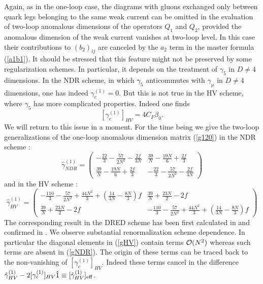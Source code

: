 \documentclass[12pt,rotate]{article}
\newcommand{\be}{\begin{equation}}
\newcommand{\ee}{\end{equation}}
\newcommand{\ord}{{\cal O}}
\begin{document}
\begin{itemize}
\begin{itemize}
\begin{itemize}
Again, as in the one-loop case, the diagrams with gluons exchanged only
between quark legs belonging to the same weak current can be omitted in
the evaluation of two-loop anomalous dimensions of the operators
$Q_1$ and $Q_2$, provided the anomalous dimension of the weak current
vanishes at two-loop level. In this case their contributions to
$(b_2)_{ij}$ are canceled by the $a_2$ term in the master formula
(\ref{a1b1}). It should be stressed that this
feature might not be preserved by some regularization schemes. In particular,
it depends on the treatment of $\gamma_5$ in $D\not=4$ dimensions.
In the NDR scheme, in which $\gamma_5$ anticommutes with $\gamma_\mu$ in
$D\not=4$ dimensions, one has indeed $\gamma^{(1)}_c=0$. But this is
not true in the HV scheme, where $\gamma_5$ has more complicated
properties. Indeed one finds \cite{WEISZ}
\be\label{anc}
[\gamma_c^{(1)}]_{HV}=4 C_F \beta_0.
\ee 
We will return to this issue in a moment. For the time being we 
give the two-loop generalizations of the one-loop anomalous
dimension matrix (\ref{g120}) in the NDR scheme \cite{WEISZ}:
\begin{equation}\label{gNDR} 
 \hat\gamma^{(1)}_{NDR}=
 \left(\begin{array}{cc}
 -\frac{22}{3}-\frac{57}{2 N^2}-\frac{2f}{3N} & 
  \frac{39}{N}-\frac{19N}{6}+\frac{2f}{3} \\
 \frac{39}{N}-\frac{19N}{6}+\frac{2f}{3} & 
 -\frac{22}{3}-\frac{57}{2 N^2}-\frac{2f}{3N}
    \end{array}\right)   
\end{equation}
and in the HV scheme \cite{WEISZ}:
\begin{equation}\label{gHV} 
 \hat\gamma^{(1)}_{HV}=
 \left(\begin{array}{cc}
 -\frac{110}{3}-\frac{57}{2 N^2}+\frac{44 N^2}{3}+
\left(\frac{14}{3N}-\frac{8N}{3}\right) f & 
  \frac{39}{N}+\frac{23N}{2}-2f \\
  \frac{39}{N}+\frac{23N}{2}-2f  & 
 -\frac{110}{3}-\frac{57}{2 N^2}+\frac{44 N^2}{3}+
\left(\frac{14}{3N}-\frac{8N}{3}\right) f
    \end{array}\right)   
\end{equation}
The corresponding result in the DRED scheme has been first
calculated in \cite{ACMP} and confirmed in \cite{WEISZ}.
We observe substantial renormalization scheme dependence. 
In particular the diagonal elements in (\ref{gHV}) contain
terms $\ord(N^2)$ whereas such terms are absent in (\ref{gNDR}).
The origin of these terms can be traced back to the non-vanishing
of $[\gamma_c^{(1)}]_{HV}$. Indeed these terms cancel in the
difference $\hat\gamma^{(1)}_{HV}-2 [\gamma_c^{(1)}]_{HV} \hat 1 
\equiv[\hat\gamma^{(1)}_{HV}]_{\rm eff}$.


\end{itemize}
\end{itemize}
\end{itemize}
\end{document}
